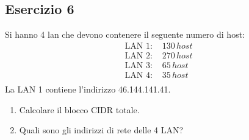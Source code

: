 \documentclass[a4paper]{article}
\begin{document}
\subsection{Esercizio 6}
Si hanno 4 lan che devono contenere il seguente numero di host:
\[
\begin{aligned}
  \text{LAN 1: } & 130 \, host\\
  \text{LAN 2: } & 270 \, host\\
  \text{LAN 3: } & 65 \, host\\
  \text{LAN 4: } & 35 \, host\\
\end{aligned}
\] 
La LAN 1 contiene l'indirizzo 46.144.141.41.
\begin{enumerate}
  \item Calcolare il blocco CIDR totale.
  \item Quali sono gli indirizzi di rete delle 4 LAN?
\end{enumerate}
\end{document}
